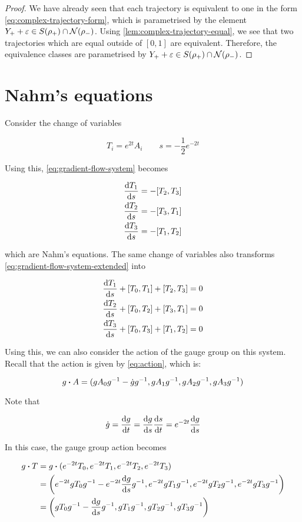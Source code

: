 \documentclass{report}
\begin{document}
\begin{proof}
    We have already seen that each trajectory is equivalent to one in the form \cref{eq:complex-trajectory-form}, which is parametrised by the element \(Y_+ + \varepsilon \in S(\rho_+) \cap \mathcal{N}(\rho_-)\). Using \cref{lem:complex-trajectory-equal}, we see that two trajectories which are equal outside of \([0, 1]\) are equivalent. Therefore, the equivalence classes are parametrised by \(Y_+ + \varepsilon \in S(\rho_+) \cap \mathcal{N}(\rho_-)\).
\end{proof}

\section{Nahm's equations}

\label{sec:nahm}

Consider the change of variables

\[T_i = e^{2t}A_i \qquad s = -\frac12e^{-2t}\]

Using this, \cref{eq:gradient-flow-system} becomes

\begin{align*}
    \dv{T_1}{s} &= -[T_2, T_3] \\
    \dv{T_2}{s} &= -[T_3, T_1] \\
    \dv{T_3}{s} &= -[T_1, T_2]
\end{align*}

which are Nahm's equations. The same change of variables also transforms \cref{eq:gradient-flow-system-extended} into 

\begin{align*}
    \dv{T_1}{s} + [T_0, T_1] + [T_2, T_3] &= 0 \\
    \dv{T_2}{s} + [T_0, T_2] + [T_3, T_1] &= 0 \\
    \dv{T_3}{s} + [T_0, T_3] + [T_1, T_2] &= 0 \\
\end{align*}

Using this, we can also consider the action of the gauge group on this system. Recall that the action is given by \cref{eq:action}, which is:

\[g \vdot A = (gA_0g^{-1} - \dot g g^{-1}, gA_1g^{-1}, gA_2g^{-1}, gA_3g^{-1})\]

Note that

\[\dot g = \dv{g}{t} = \dv{g}{s}\dv{s}{t} = e^{-2t}\dv{g}{s}\]

In this case, the gauge group action becomes

\begin{align*}
    g \vdot T &= g \vdot (e^{-2t}T_0, e^{-2t}T_1, e^{-2t}T_2, e^{-2t}T_3) \\
    &= \left(e^{-2t}gT_0g^{-1} - e^{-2t}\dv{g}{s} g^{-1}, e^{-2t}gT_1g^{-1}, e^{-2t}gT_2g^{-1}, e^{-2t}gT_3g^{-1}\right) \\
    &= \left(gT_0g^{-1} - \dv{g}{s}g^{-1}, gT_1g^{-1}, gT_2g^{-1}, gT_3g^{-1}\right)
\end{align*}
\end{document}
